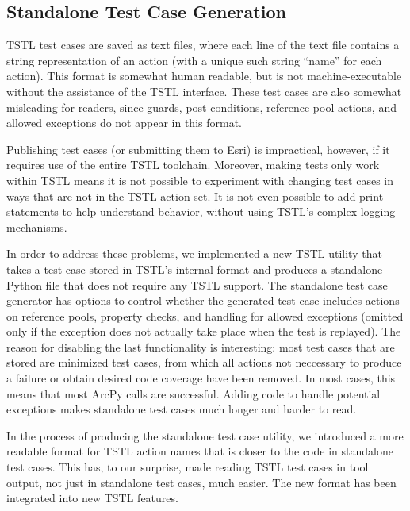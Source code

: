 \subsection{Standalone Test Case Generation}

TSTL test cases are saved as text files, where each line of the text
file contains a string representation of an action (with a unique
such string ``name'' for each action).  This format is somewhat human
readable, but is not machine-executable without the assistance of the
TSTL interface.  These test cases are also somewhat misleading for
readers, since guards, post-conditions, reference pool actions, and
allowed exceptions do not appear in this format.

Publishing test cases (or submitting them to Esri) is impractical,
however, if it requires use of the entire TSTL toolchain.  Moreover,
making tests only work within TSTL means it is not possible to
experiment with changing test cases in ways that are not in the TSTL
action set.  It is not  even possible to add print statements to help understand
behavior, without using TSTL's complex logging mechanisms.  

In order to address these problems, we implemented a new TSTL utility
that takes a test case stored in TSTL's internal format and produces a
standalone Python file that does not require any TSTL support.  The
standalone test case generator has options to control whether the
generated test case includes actions on reference pools, property
checks, and handling for allowed exceptions (omitted only if the exception does not
actually take place when the test is replayed).  The reason for disabling
the last functionality is interesting:  most test cases that are
stored are minimized \cite{DD} test cases, from which all actions not
neccessary to produce a failure or obtain desired code coverage have
been removed.  In most cases, this means that most ArcPy calls are
successful.  Adding code to handle potential exceptions makes
standalone test cases much longer and harder to read.

In the process of producing the standalone test case utility, we
introduced a more readable format for TSTL action names that is closer
to the code in standalone test cases.  This has, to our surprise, made
reading TSTL test cases in tool output, not just in standalone test
cases, much easier.  The new format has been integrated into new TSTL features.